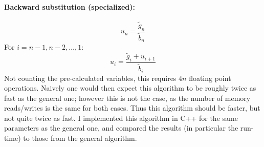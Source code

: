 \documentclass[a4paper,english]{article}
\begin{document}
\paragraph{Backward substitution (specialized):}
\begin{equation}
  u_n = \frac{\tilde{g}_n}{\tilde{b}_n}
\end{equation}
For $i = n-1, n-2, \dots, 1$:
\begin{equation}
  u_i = \frac{\tilde{g}_i+u_{i+1}}{\tilde{b}_i}
\end{equation}
Not counting the pre-calculated variables, this requires $4n$ floating point operations. Naively one would then expect this algorithm to be roughly twice as fast as the general one; however this is not the case, as the number of memory reads/writes is the same for both cases. Thus this algorithm should be faster, but not quite twice as fast. I implemented this algorithm in C++ for the same parameters as the general one, and compared the results (in particular the run-time) to those from the general algorithm.
\end{document}
